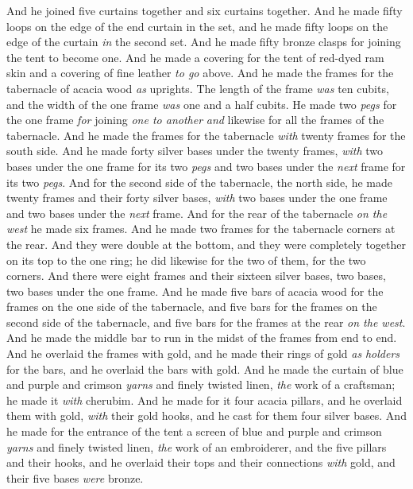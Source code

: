 \begin{biblechapter}
\verse And he joined five curtains together and six curtains together.
\verse And he made fifty loops on the edge of the end curtain in the set, and he made fifty loops on the edge of the curtain \textit{in} the second set.
\verse And he made fifty bronze clasps for joining the tent to become one.
\verse And he made a covering for the tent of red-dyed ram skin and a covering of fine leather \textit{to go} above.
\verse And he made the frames for the tabernacle of acacia wood \textit{as} uprights.
\verse The length of the frame \textit{was} ten cubits, and the width of the one frame \textit{was} one and a half cubits.
\verse He made two \textit{pegs} for the one frame \textit{for} joining \textit{one to another} \textit{and} likewise for all the frames of the tabernacle.
\verse And he made the frames for the tabernacle \textit{with} twenty frames for the south side.
\verse And he made forty silver bases under the twenty frames, \textit{with} two bases under the one frame for its two \textit{pegs} and two bases under the \textit{next} frame for its two \textit{pegs}.
\verse And for the second side of the tabernacle, the north side, he made twenty frames
\verse and their forty silver bases, \textit{with} two bases under the one frame and two bases under the \textit{next} frame.
\verse And for the rear of the tabernacle \textit{on the west} he made six frames.
\verse And he made two frames for the tabernacle corners at the rear.
\verse And they were double at the bottom, and they were completely together on its top to the one ring; he did likewise for the two of them, for the two corners.
\verse And there were eight frames and their sixteen silver bases, two bases, two bases under the one frame.
\verse And he made five bars of acacia wood for the frames on the one side of the tabernacle,
\verse and five bars for the frames on the second side of the tabernacle, and five bars for the frames at the rear \textit{on the west}.
\verse And he made the middle bar to run in the midst of the frames from end to end.
\verse And he overlaid the frames with gold, and he made their rings of gold \textit{as} \textit{holders} for the bars, and he overlaid the bars with gold.
\verse And he made the curtain of blue and purple and crimson \textit{yarns} and finely twisted linen, \textit{the} work of a craftsman; he made it \textit{with} cherubim.
\verse And he made for it four acacia pillars, and he overlaid them with gold, \textit{with} their gold hooks, and he cast for them four silver bases.
\verse And he made for the entrance of the tent a screen of blue and purple and crimson \textit{yarns} and finely twisted linen, \textit{the} work of an embroiderer,
\verse and the five pillars and their hooks, and he overlaid their tops and their connections \textit{with} gold, and their five bases \textit{were} bronze.
\end{biblechapter}

